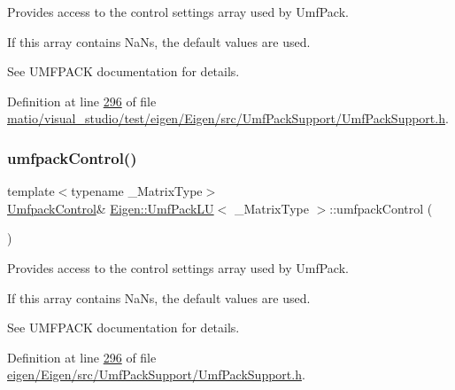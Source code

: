 Provides access to the control settings array used by Umf\+Pack.

If this array contains NaN\textquotesingle{}s, the default values are used.

See U\+M\+F\+P\+A\+CK documentation for details. 

Definition at line \hyperlink{matio_2visual__studio_2test_2eigen_2_eigen_2src_2_umf_pack_support_2_umf_pack_support_8h_source_l00296}{296} of file \hyperlink{matio_2visual__studio_2test_2eigen_2_eigen_2src_2_umf_pack_support_2_umf_pack_support_8h_source}{matio/visual\+\_\+studio/test/eigen/\+Eigen/src/\+Umf\+Pack\+Support/\+Umf\+Pack\+Support.\+h}.

\mbox{\label{class_eigen_1_1_umf_pack_l_u_a679bd267a0407d4ca985d97f0b864101}} 
\subsubsection{\texorpdfstring{umfpack\+Control()}{umfpackControl()}\hspace{0.1cm}{\footnotesize\ttfamily [4/4]}}
{\footnotesize\ttfamily template$<$typename \+\_\+\+Matrix\+Type$>$ \\
\hyperlink{group___core___module}{Umfpack\+Control}\& \hyperlink{class_eigen_1_1_umf_pack_l_u}{Eigen\+::\+Umf\+Pack\+LU}$<$ \+\_\+\+Matrix\+Type $>$\+::umfpack\+Control (\begin{DoxyParamCaption}{ }\end{DoxyParamCaption})\hspace{0.3cm}{\ttfamily [inline]}}

Provides access to the control settings array used by Umf\+Pack.

If this array contains NaN\textquotesingle{}s, the default values are used.

See U\+M\+F\+P\+A\+CK documentation for details. 

Definition at line \hyperlink{eigen_2_eigen_2src_2_umf_pack_support_2_umf_pack_support_8h_source_l00296}{296} of file \hyperlink{eigen_2_eigen_2src_2_umf_pack_support_2_umf_pack_support_8h_source}{eigen/\+Eigen/src/\+Umf\+Pack\+Support/\+Umf\+Pack\+Support.\+h}.

\mbox{\label{class_eigen_1_1_umf_pack_l_u_a822fa9d82754269c379dc4ce17920b0a}} 
